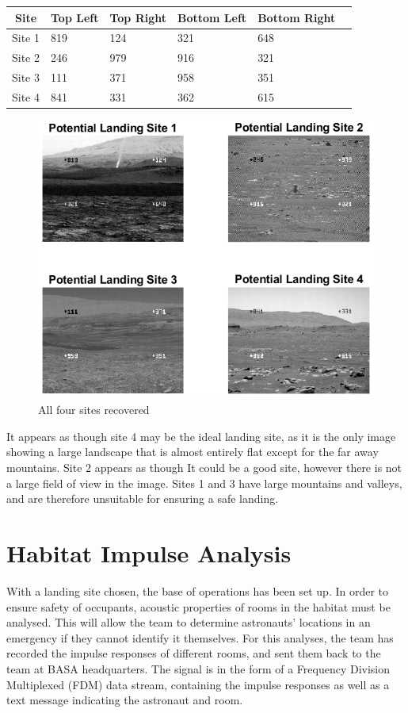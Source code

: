 \documentclass[12pt]{article}
\begin{document}
\begin{tabularx}{\textwidth}{c| *{5}{Y} }
    Site   & Top Left & Top Right & Bottom Left & Bottom Right \\
    \hline
    Site 1 & 819      & 124       & 321         & 648          \\
    Site 2 & 246      & 979       & 916         & 321          \\
    Site 3 & 111      & 371       & 958         & 351          \\
    Site 4 & 841      & 331       & 362         & 615
\end{tabularx}
\pagebreak
\begin{figure}
    \centering
    \includegraphics[width=12cm]{figures/p2-landingsites.png}
    \caption{All four sites recovered\label{fig:p2-landingsites}}
\end{figure}

It appears as though site 4 may be the ideal landing site, as it is the only
image showing a large landscape that is almost entirely flat except for the far
away mountains. Site 2 appears as though It could be a good site, however there
is not a large field of view in the image. Sites 1 and 3 have large mountains
and valleys, and are therefore unsuitable for ensuring a safe landing.

\pagebreak
%
%
\section{Habitat Impulse Analysis}
With a landing site chosen, the base of operations has been set up. In order to
ensure safety of occupants, acoustic properties of rooms in the habitat must be
analysed. This will allow the team to determine astronauts' locations in an
emergency if they cannot identify it themselves. For this analyses, the team
has recorded the impulse responses of different rooms, and sent them back to
the team at BASA headquarters. The signal is in the form of a Frequency
Division Multiplexed (FDM) data stream, containing the impulse responses as
well as a text message indicating the astronaut and room.
\end{document}
